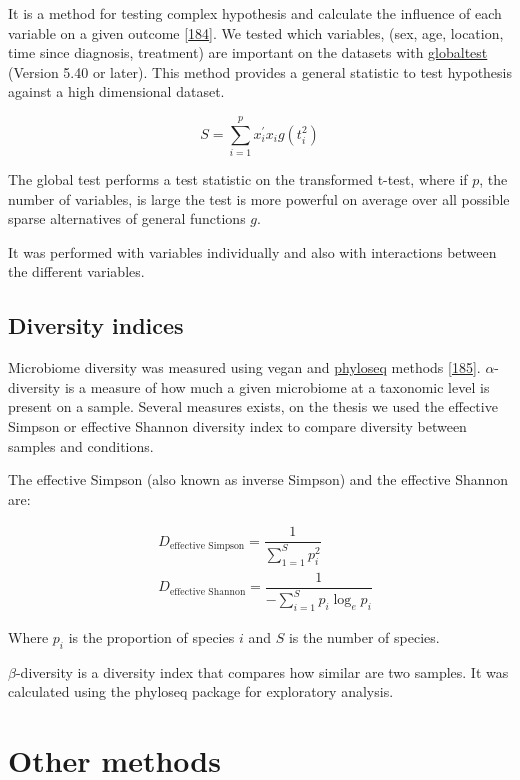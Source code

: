 \documentclass[
  12pt,
  a4paper,
  twoside,
  openright]{book}
\begin{document}
It is a method for testing complex hypothesis and calculate the influence of each variable on a given outcome {[}\protect\hyperlink{ref-goeman2006}{184}{]}.
We tested which variables, (sex, age, location, time since diagnosis, treatment) are important on the datasets with \href{https://bioconductor.org/packages/globaltest}{globaltest} (Version 5.40 or later).
This method provides a general statistic to test hypothesis against a high dimensional dataset.

\[
S = \sum_{i=1}^p x_i^{'} x_i g(t_i^2)
\]

The global test performs a test statistic on the transformed t-test, where if \(p\), the number of variables, is large the test is more powerful on average over all possible sparse alternatives of general functions \(g\).

It was performed with variables individually and also with interactions between the different variables.

\hypertarget{diversity-indices}{%
\subsection{Diversity indices}\label{diversity-indices}}

Microbiome diversity was measured using vegan and \href{https://bioconductor.org/packages/phyloseq}{phyloseq} methods {[}\protect\hyperlink{ref-oksanen2020}{185}{]}.
\(\alpha\)-diversity is a measure of how much a given microbiome at a taxonomic level is present on a sample.
Several measures exists, on the thesis we used the effective Simpson or effective Shannon diversity index to compare diversity between samples and conditions.

The effective Simpson (also known as inverse Simpson) and the effective Shannon are:

\[
\begin{aligned}
& D_{\text{effective Simpson}} = \dfrac{1}{\sum_{1=1}^Sp_i^2} \\
& D_{\text{effective Shannon}} = \dfrac{1}{-\sum_{i =1}^S p_i \log_e{p_i}}
\end{aligned}
\]

Where \(p_i\) is the proportion of species \(i\) and \(S\) is the number of species.

\(\beta\)-diversity is a diversity index that compares how similar are two samples.
It was calculated using the phyloseq package for exploratory analysis.

\hypertarget{other-methods}{%
\section{Other methods}\label{other-methods}}
\end{document}
